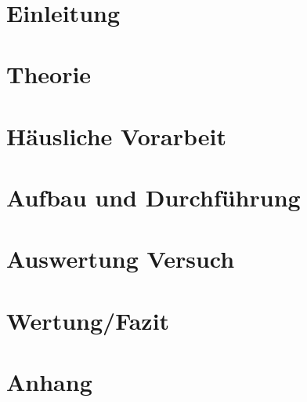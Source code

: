 \documentclass[a4paper]{scrartcl}
\def\header#1#2{
  \begin{center}
    {\Large #1}\\
    {#2}
  \end{center}
}
\numberwithin{equation}{subsection}
\begin{document}
\vspace{10pt}
\header{\HEADDING}{\SUBHEADDING}

\tableofcontents

\newpage

\section{Einleitung}

\newpage
\section{Theorie}

\newpage
\section{Häusliche Vorarbeit}

\newpage
\section{Aufbau und Durchführung}

\newpage
\section{Auswertung Versuch}

\newpage
\section{Wertung/Fazit}

\newpage
\section{Anhang}

\newpage


\label{LastPage}
\end{document}
